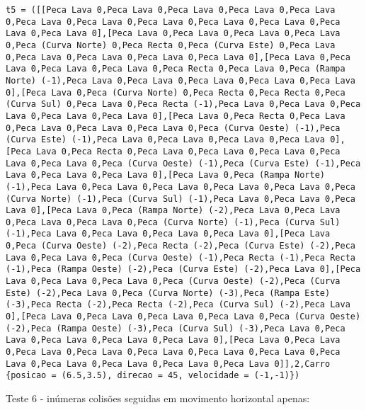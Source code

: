 \documentclass[a4paper]{report}
\begin{document}
\begin{lstlisting}
t5 = ([[Peca Lava 0,Peca Lava 0,Peca Lava 0,Peca Lava 0,Peca Lava 0,Peca Lava 0,Peca Lava 0,Peca Lava 0,Peca Lava 0,Peca Lava 0,Peca Lava 0,Peca Lava 0],[Peca Lava 0,Peca Lava 0,Peca Lava 0,Peca Lava 0,Peca (Curva Norte) 0,Peca Recta 0,Peca (Curva Este) 0,Peca Lava 0,Peca Lava 0,Peca Lava 0,Peca Lava 0,Peca Lava 0],[Peca Lava 0,Peca Lava 0,Peca Lava 0,Peca Lava 0,Peca Recta 0,Peca Lava 0,Peca (Rampa Norte) (-1),Peca Lava 0,Peca Lava 0,Peca Lava 0,Peca Lava 0,Peca Lava 0],[Peca Lava 0,Peca (Curva Norte) 0,Peca Recta 0,Peca Recta 0,Peca (Curva Sul) 0,Peca Lava 0,Peca Recta (-1),Peca Lava 0,Peca Lava 0,Peca Lava 0,Peca Lava 0,Peca Lava 0],[Peca Lava 0,Peca Recta 0,Peca Lava 0,Peca Lava 0,Peca Lava 0,Peca Lava 0,Peca (Curva Oeste) (-1),Peca (Curva Este) (-1),Peca Lava 0,Peca Lava 0,Peca Lava 0,Peca Lava 0],[Peca Lava 0,Peca Recta 0,Peca Lava 0,Peca Lava 0,Peca Lava 0,Peca Lava 0,Peca Lava 0,Peca (Curva Oeste) (-1),Peca (Curva Este) (-1),Peca Lava 0,Peca Lava 0,Peca Lava 0],[Peca Lava 0,Peca (Rampa Norte) (-1),Peca Lava 0,Peca Lava 0,Peca Lava 0,Peca Lava 0,Peca Lava 0,Peca (Curva Norte) (-1),Peca (Curva Sul) (-1),Peca Lava 0,Peca Lava 0,Peca Lava 0],[Peca Lava 0,Peca (Rampa Norte) (-2),Peca Lava 0,Peca Lava 0,Peca Lava 0,Peca Lava 0,Peca (Curva Norte) (-1),Peca (Curva Sul) (-1),Peca Lava 0,Peca Lava 0,Peca Lava 0,Peca Lava 0],[Peca Lava 0,Peca (Curva Oeste) (-2),Peca Recta (-2),Peca (Curva Este) (-2),Peca Lava 0,Peca Lava 0,Peca (Curva Oeste) (-1),Peca Recta (-1),Peca Recta (-1),Peca (Rampa Oeste) (-2),Peca (Curva Este) (-2),Peca Lava 0],[Peca Lava 0,Peca Lava 0,Peca Lava 0,Peca (Curva Oeste) (-2),Peca (Curva Este) (-2),Peca Lava 0,Peca (Curva Norte) (-3),Peca (Rampa Este) (-3),Peca Recta (-2),Peca Recta (-2),Peca (Curva Sul) (-2),Peca Lava 0],[Peca Lava 0,Peca Lava 0,Peca Lava 0,Peca Lava 0,Peca (Curva Oeste) (-2),Peca (Rampa Oeste) (-3),Peca (Curva Sul) (-3),Peca Lava 0,Peca Lava 0,Peca Lava 0,Peca Lava 0,Peca Lava 0],[Peca Lava 0,Peca Lava 0,Peca Lava 0,Peca Lava 0,Peca Lava 0,Peca Lava 0,Peca Lava 0,Peca Lava 0,Peca Lava 0,Peca Lava 0,Peca Lava 0,Peca Lava 0]],2,Carro {posicao = (6.5,3.5), direcao = 45, velocidade = (-1,-1)})
\end{lstlisting}

Teste 6 - inúmeras colisões seguidas em movimento horizontal apenas:
\end{document}
